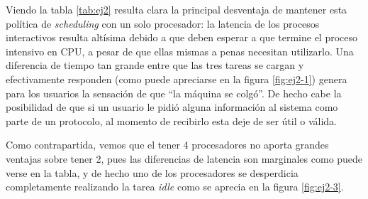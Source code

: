 Viendo la tabla \ref{tab:ej2} resulta clara la principal desventaja de mantener esta política de \emph{scheduling} con un solo procesador: la latencia de los procesos interactivos resulta altísima debido a que deben esperar a que termine el proceso intensivo en CPU, a pesar de que ellas mismas a penas necesitan utilizarlo. Una diferencia de tiempo tan grande entre que las tres tareas se cargan y efectivamente responden (como puede apreciarse en la figura \ref{fig:ej2-1}) genera para los usuarios la sensación de que ``la máquina se colgó''. De hecho cabe la posibilidad de que si un usuario le pidió alguna información al sistema como parte de un protocolo, al momento de recibirlo esta deje de ser útil o válida.   

Como contrapartida, vemos que el tener 4 procesadores no aporta grandes ventajas sobre tener 2, pues las diferencias de latencia son marginales como puede verse en la tabla, y de hecho uno de los procesadores se desperdicia completamente realizando la tarea \emph{idle} como se aprecia en la figura \ref{fig:ej2-3}.
 


